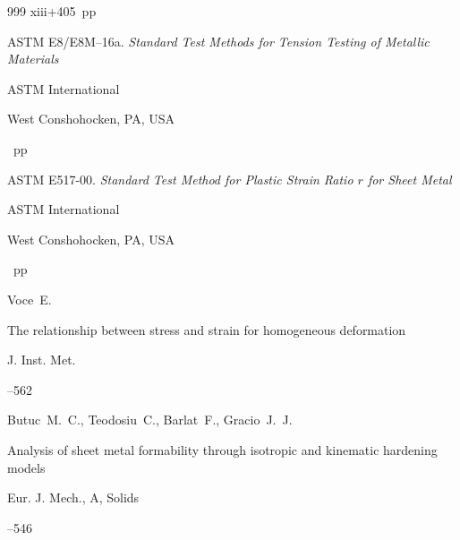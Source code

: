 \begin{thebibliography}{999}
\totalpages xiii+405~pp \nofrills






\thesis \rm ASTM E8/E8M--16a. \it Standard Test Methods for Tension Testing of Metallic Materials


\publ ASTM International

\publaddr West Conshohocken, PA, USA

~pp \nofrills





\thesis \rm ASTM E517-00. \it   Standard Test Method for Plastic Strain Ratio $r$ for Sheet Metal


\publ ASTM International

\publaddr West Conshohocken, PA, USA

~pp \nofrills





\by Voce~E.


\paper The relationship between stress and strain for homogeneous deformation

\jour J. Inst. Met.


–562




\by Butuc~M.~C., Teodosiu~C., Barlat~F., Gracio~J.~J.

\paper Analysis of sheet metal formability through isotropic and kinematic hardening models


\jour Eur. J. Mech., A, Solids 



--546 




\end{thebibliography}

